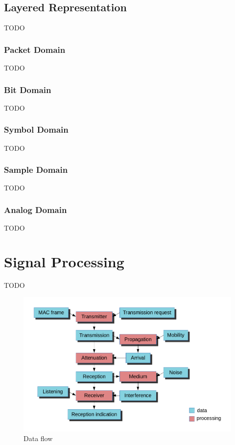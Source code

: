 \subsection{Layered Representation}

TODO

\subsubsection{Packet Domain}

TODO

\subsubsection{Bit Domain}

TODO

\subsubsection{Symbol Domain}

TODO

\subsubsection{Sample Domain}

TODO

\subsubsection{Analog Domain}

TODO

\section{Signal Processing}

TODO

\begin{center}
\begin{figure}
\includegraphics[width=\textwidth]{figures/phydataflow}
\caption{Data flow}
\end{figure}
\end{center}

